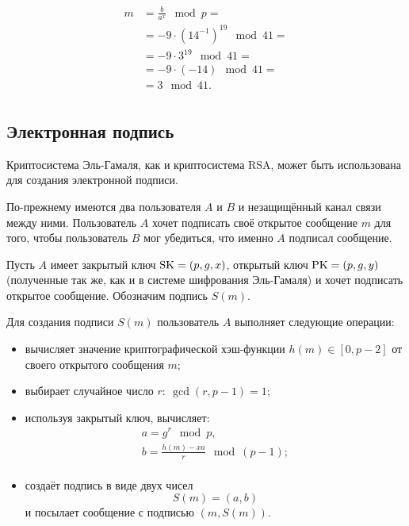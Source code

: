 \begin{enumerate}
\begin{enumerate}
\[\begin{array}{ll}
                    m & = \frac{b}{a^x} \mod p = \\
                    & = -9 \cdot (14^{-1})^{19} \mod 41 = \\
                    & = -9 \cdot 3^{19} \mod 41 = \\
                    & = -9 \cdot (-14) \mod 41 = \\
                    & = 3 \mod 41. \\
                \end{array} \]
        \end{enumerate}
\end{enumerate}

\exampleend
{}

\subsection{Электронная подпись}

Криптосистема Эль-Гамаля, как и криптосистема RSA, может быть использована для создания электронной подписи.

По-прежнему имеются два пользователя $A$ и $B$ и незащищённый канал связи между ними. Пользователь $A$ хочет подписать своё открытое сообщение $m$ для того, чтобы пользователь $B$ мог убедиться, что именно $A$ подписал сообщение.

Пусть $A$ имеет закрытый ключ $\textrm{SK} = (p, g, x)$, открытый ключ $\textrm{PK} = (p, g, y)$ (полученные так же, как и в системе шифрования Эль-Гамаля) и хочет подписать открытое сообщение. Обозначим подпись $S(m)$.

Для создания подписи $S(m)$ пользователь $A$ выполняет следующие операции:
\begin{itemize}
    \item вычисляет значение криптографической хэш-функции $h(m) \in [0,p-2]$ от своего открытого сообщения $m$;
    \item выбирает случайное число $r: ~ \gcd(r, p-1)=1$;
    \item используя закрытый ключ, вычисляет:
        \[ \begin{array}{l}
            a = g^r \mod p, \\
            b = \frac{h(m) - xa}{r} \mod (p-1); \\
        \end{array} \]
    \item создаёт подпись в виде двух чисел
        \[ S(m) = (a, b) \]
        и посылает сообщение с подписью $(m, S(m))$.
\end{itemize}

